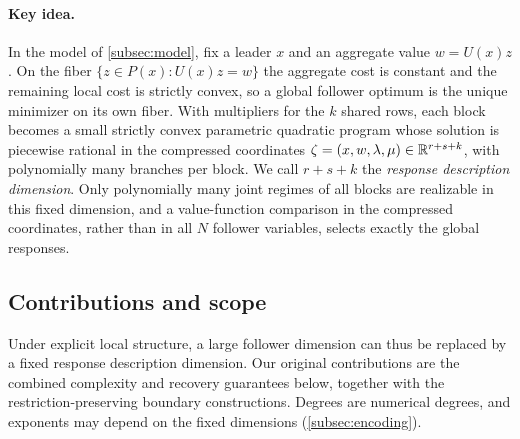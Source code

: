 \paragraph{Key idea.}
In the model of \cref{subsec:model}, fix a leader $x$ and an aggregate
value $w=U(x)z$. On the fiber $\{z\in P(x):U(x)z=w\}$ the aggregate cost is
constant and the remaining local cost is strictly convex, so a global
follower optimum is the unique minimizer on its own fiber. With multipliers
for the $k$ shared rows, each block becomes a small strictly convex
parametric quadratic program whose solution is piecewise rational in the
compressed coordinates $\zeta=(x,w,\lambda,\mu)\in\mathbb R^{r+s+k}$, with
polynomially many branches per block. We call
$r+s+k$ the \emph{response description dimension}. Only polynomially many
joint regimes of all blocks are realizable in this fixed dimension, and a
value-function comparison in the compressed coordinates, rather than in all
$N$ follower variables, selects exactly the global responses.

\subsection{Contributions and scope}\label{subsec:contributions}

Under explicit local structure, a large follower dimension can thus be
replaced by a fixed response description dimension. Our original
contributions are the combined complexity and recovery guarantees
below, together with the restriction-preserving boundary constructions.
Degrees are numerical degrees, and exponents may depend on the fixed
dimensions (\cref{subsec:encoding}).

